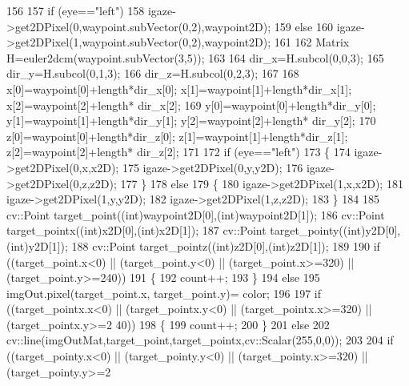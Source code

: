 \begin{DoxyCode}
156 
157             \textcolor{keywordflow}{if} (eye==\textcolor{stringliteral}{"left"})
158                 igaze->get2DPixel(0,waypoint.subVector(0,2),waypoint2D);
159             \textcolor{keywordflow}{else}
160                 igaze->get2DPixel(1,waypoint.subVector(0,2),waypoint2D);
161 
162             Matrix H=euler2dcm(waypoint.subVector(3,5));
163 
164             dir\_x=H.subcol(0,0,3);
165             dir\_y=H.subcol(0,1,3);
166             dir\_z=H.subcol(0,2,3);
167 
168             x[0]=waypoint[0]+length*dir\_x[0]; x[1]=waypoint[1]+length*dir\_x[1]; x[2]=waypoint[2]+length*
      dir\_x[2];
169             y[0]=waypoint[0]+length*dir\_y[0]; y[1]=waypoint[1]+length*dir\_y[1]; y[2]=waypoint[2]+length*
      dir\_y[2];
170             z[0]=waypoint[0]+length*dir\_z[0]; z[1]=waypoint[1]+length*dir\_z[1]; z[2]=waypoint[2]+length*
      dir\_z[2];
171 
172             \textcolor{keywordflow}{if} (eye==\textcolor{stringliteral}{"left"})
173             \{
174                 igaze->get2DPixel(0,x,x2D);
175                 igaze->get2DPixel(0,y,y2D);
176                 igaze->get2DPixel(0,z,z2D);
177             \}
178             \textcolor{keywordflow}{else}
179             \{
180                 igaze->get2DPixel(1,x,x2D);
181                 igaze->get2DPixel(1,y,y2D);
182                 igaze->get2DPixel(1,z,z2D);
183             \}
184 
185             cv::Point  target\_point((\textcolor{keywordtype}{int})waypoint2D[0],(\textcolor{keywordtype}{int})waypoint2D[1]);
186             cv::Point  target\_pointx((\textcolor{keywordtype}{int})x2D[0],(\textcolor{keywordtype}{int})x2D[1]);
187             cv::Point  target\_pointy((\textcolor{keywordtype}{int})y2D[0],(\textcolor{keywordtype}{int})y2D[1]);
188             cv::Point  target\_pointz((\textcolor{keywordtype}{int})z2D[0],(\textcolor{keywordtype}{int})z2D[1]);
189 
190             \textcolor{keywordflow}{if} ((target\_point.x<0) || (target\_point.y<0) || (target\_point.x>=320) || (target\_point.y>=240))
191             \{
192                 count++;
193             \}
194             \textcolor{keywordflow}{else}
195                 imgOut.pixel(target\_point.x, target\_point.y)= color;
196 
197             \textcolor{keywordflow}{if} ((target\_pointx.x<0) || (target\_pointx.y<0) || (target\_pointx.x>=320) || (target\_pointx.y>=2
      40))
198             \{
199                 count++;
200             \}
201             \textcolor{keywordflow}{else}
202                 cv::line(imgOutMat,target\_point,target\_pointx,cv::Scalar(255,0,0));
203 
204             \textcolor{keywordflow}{if} ((target\_pointy.x<0) || (target\_pointy.y<0) || (target\_pointy.x>=320) || (target\_pointy.y>=2

\end{DoxyCode}

